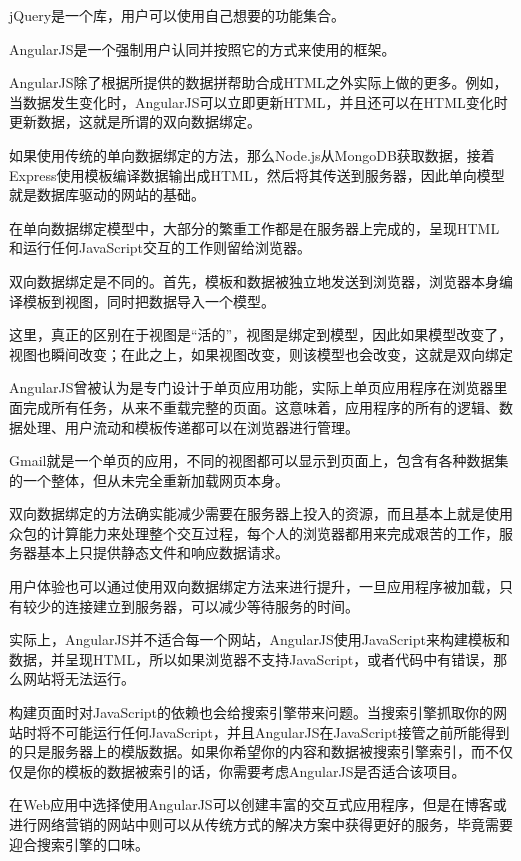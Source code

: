 \begin{compactitem}
\item jQuery是一个库，用户可以使用自己想要的功能集合。
\item AngularJS是一个强制用户认同并按照它的方式来使用的框架。
\end{compactitem}

AngularJS除了根据所提供的数据拼帮助合成HTML之外实际上做的更多。例如，当数据发生变化时，AngularJS可以立即更新HTML，并且还可以在HTML变化时更新数据，这就是所谓的双向数据绑定。


如果使用传统的单向数据绑定的方法，那么Node.js从MongoDB获取数据，接着Express使用模板编译数据输出成HTML，然后将其传送到服务器，因此单向模型就是数据库驱动的网站的基础。

在单向数据绑定模型中，大部分的繁重工作都是在服务器上完成的，呈现HTML和运行任何JavaScript交互的工作则留给浏览器。

双向数据绑定是不同的。首先，模板和数据被独立地发送到浏览器，浏览器本身编译模板到视图，同时把数据导入一个模型。

这里，真正的区别在于视图是“活的”，视图是绑定到模型，因此如果模型改变了，视图也瞬间改变；在此之上，如果视图改变，则该模型也会改变，这就是双向绑定

AngularJS曾被认为是专门设计于单页应用功能，实际上单页应用程序在浏览器里面完成所有任务，从来不重载完整的页面。这意味着，应用程序的所有的逻辑、数据处理、用户流动和模板传递都可以在浏览器进行管理。

Gmail就是一个单页的应用，不同的视图都可以显示到页面上，包含有各种数据集的一个整体，但从未完全重新加载网页本身。

双向数据绑定的方法确实能减少需要在服务器上投入的资源，而且基本上就是使用众包的计算能力来处理整个交互过程，每个人的浏览器都用来完成艰苦的工作，服务器基本上只提供静态文件和响应数据请求。

用户体验也可以通过使用双向数据绑定方法来进行提升，一旦应用程序被加载，只有较少的连接建立到服务器，可以减少等待服务的时间。

实际上，AngularJS并不适合每一个网站，AngularJS使用JavaScript来构建模板和数据，并呈现HTML，所以如果浏览器不支持JavaScript，或者代码中有错误，那么网站将无法运行。


构建页面时对JavaScript的依赖也会给搜索引擎带来问题。当搜索引擎抓取你的网站时将不可能运行任何JavaScript，并且AngularJS在JavaScript接管之前所能得到的只是服务器上的模版数据。如果你希望你的内容和数据被搜索引擎索引，而不仅仅是你的模板的数据被索引的话，你需要考虑AngularJS是否适合该项目。


在Web应用中选择使用AngularJS可以创建丰富的交互式应用程序，但是在博客或进行网络营销的网站中则可以从传统方式的解决方案中获得更好的服务，毕竟需要迎合搜索引擎的口味。



